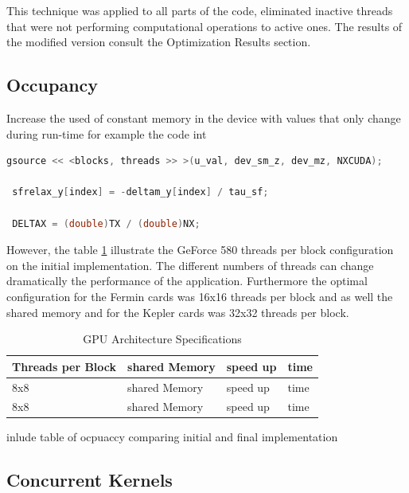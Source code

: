 This technique was applied to all parts of the code, eliminated inactive threads that were not performing computational operations to active ones. The results of the modified version consult the Optimization Results section. 

\subsection{Occupancy}
 
Increase the used of constant memory in the device with values that only change during run-time for example the code int 
 
 \begin{lstlisting}[language=C++, caption={Constant Memory changes}]
 gsource << <blocks, threads >> >(u_val, dev_sm_z, dev_mz, NXCUDA);
  
 sfrelax_y[index] = -deltam_y[index] / tau_sf;
     
 DELTAX = (double)TX / (double)NX;
\end{lstlisting}
 

However, the table \ref{tab:threads} illustrate the GeForce 580 threads per block configuration on the initial implementation. The different numbers of threads can change dramatically the performance of the application. Furthermore the optimal configuration for the Fermin cards was 16x16 threads per block and as well the shared memory and for the Kepler cards was 32x32 threads per block.

\begin{table}[h]
\centering
  \begin{tabular} { | l | l | l | l | }
    \hline
    Threads per Block & shared Memory & speed up & time \\
    \hline
     8x8 & shared Memory & speed up & time \\
    \hline
     8x8 & shared Memory & speed up & time \\
    \hline
  \end{tabular}
  \caption{GPU Architecture Specifications}
  \label{tab:threads}
  \end{table}

 
 
 inlude table of ocpuaccy comparing initial and final implementation 

\subsection{Concurrent Kernels}

